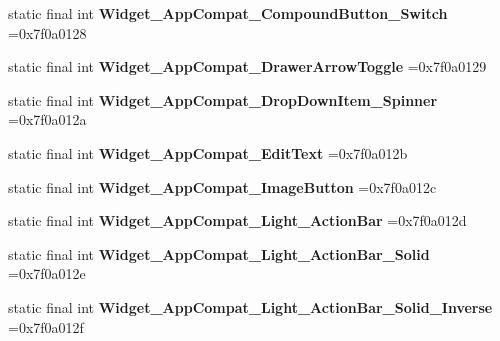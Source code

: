 \begin{DoxyCompactItemize}
\item 
\mbox{\label{classproject4_1_1xaria_1_1R_1_1style_adf526e9e894dc88cf464cf32b71578c9}} 
static final int {\bfseries Widget\+\_\+\+App\+Compat\+\_\+\+Compound\+Button\+\_\+\+Switch} =0x7f0a0128
\item 
\mbox{\label{classproject4_1_1xaria_1_1R_1_1style_a947d00b9a794d865379eae3fc766000b}} 
static final int {\bfseries Widget\+\_\+\+App\+Compat\+\_\+\+Drawer\+Arrow\+Toggle} =0x7f0a0129
\item 
\mbox{\label{classproject4_1_1xaria_1_1R_1_1style_a89c75afe0ac80b8764997ae4c4fa3cc7}} 
static final int {\bfseries Widget\+\_\+\+App\+Compat\+\_\+\+Drop\+Down\+Item\+\_\+\+Spinner} =0x7f0a012a
\item 
\mbox{\label{classproject4_1_1xaria_1_1R_1_1style_ad3da12ffc56bff04a6695cf927af2c2a}} 
static final int {\bfseries Widget\+\_\+\+App\+Compat\+\_\+\+Edit\+Text} =0x7f0a012b
\item 
\mbox{\label{classproject4_1_1xaria_1_1R_1_1style_aa4f047b9466b86e0347493dd77a25f63}} 
static final int {\bfseries Widget\+\_\+\+App\+Compat\+\_\+\+Image\+Button} =0x7f0a012c
\item 
\mbox{\label{classproject4_1_1xaria_1_1R_1_1style_a55d336367ebd08b366ed41b8f496deb9}} 
static final int {\bfseries Widget\+\_\+\+App\+Compat\+\_\+\+Light\+\_\+\+Action\+Bar} =0x7f0a012d
\item 
\mbox{\label{classproject4_1_1xaria_1_1R_1_1style_a67dfc11bfd92decad191134dce54b844}} 
static final int {\bfseries Widget\+\_\+\+App\+Compat\+\_\+\+Light\+\_\+\+Action\+Bar\+\_\+\+Solid} =0x7f0a012e
\item 
\mbox{\label{classproject4_1_1xaria_1_1R_1_1style_aef369b0ad3a28f7130eecda3409327bf}} 
static final int {\bfseries Widget\+\_\+\+App\+Compat\+\_\+\+Light\+\_\+\+Action\+Bar\+\_\+\+Solid\+\_\+\+Inverse} =0x7f0a012f
\item 

\end{DoxyCompactItemize}
